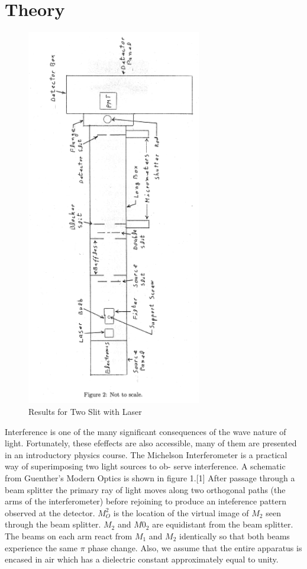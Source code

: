 \documentclass[12pt,twocolumn]{article}
\begin{document}
\section{Theory}
\begin{figure}[h!]
	\centering
	\label{fig:setup}
	\includegraphics[width=3in]{images/Labphoto1}
	\caption{Results for Two Slit with Laser}
\end{figure}
Interference is one of the many significant consequences of the wave nature of light. Fortunately, these efeffects are also accessible, many of them are presented in an introductory physics course. The Michelson Interferometer is a practical way of superimposing two light sources to ob- serve interference. A schematic from Guenther's Modern Optics is shown in figure 1.[1] After passage through a
beam splitter the primary ray of light moves along two orthogonal paths (the arms of the interferometer) before rejoining to produce an inteference pattern observed at the detector. $M^2_{O}$ is the location of the virtual image of $M_2$ seen through the beam splitter. $M_2$ and $M0_2$ are equidistant from the beam splitter. The beams on each arm react from $M_1$ and $M_ 2$ identically so that both beams experience the same $\pi$ phase change. Also, we assume that the entire apparatus is encased in air which has a dielectric constant approximately equal to unity.
\end{document}
